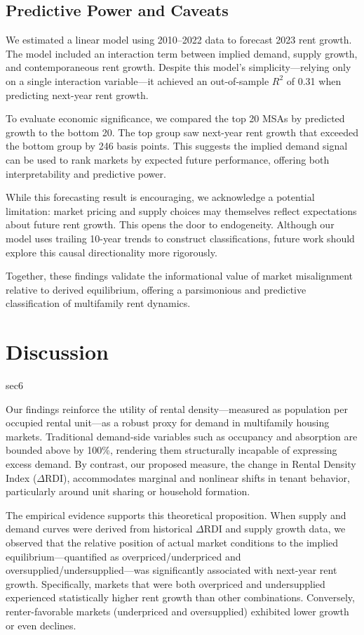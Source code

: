 \documentclass[APA,Times1COL]{WileyNJDv5} %
\begin{document}
\subsection{Predictive Power and Caveats}
We estimated a linear model using 2010--2022 data to forecast 2023 rent growth. The model included an interaction term between implied demand, supply growth, and contemporaneous rent growth. Despite this model’s simplicity—relying only on a single interaction variable—it achieved an out-of-sample $R^2$ of 0.31 when predicting next-year rent growth.

To evaluate economic significance, we compared the top 20 MSAs by predicted growth to the bottom 20. The top group saw next-year rent growth that exceeded the bottom group by 246 basis points. This suggests the implied demand signal can be used to rank markets by expected future performance, offering both interpretability and predictive power.

While this forecasting result is encouraging, we acknowledge a potential limitation: market pricing and supply choices may themselves reflect expectations about future rent growth. This opens the door to endogeneity. Although our model uses trailing 10-year trends to construct classifications, future work should explore this causal directionality more rigorously.

Together, these findings validate the informational value of market misalignment relative to derived equilibrium, offering a parsimonious and predictive classification of multifamily rent dynamics.


\section{Discussion}{sec6}

Our findings reinforce the utility of rental density---measured as population per occupied rental unit---as a robust proxy for demand in multifamily housing markets. Traditional demand-side variables such as occupancy and absorption are bounded above by 100\%, rendering them structurally incapable of expressing excess demand. By contrast, our proposed measure, the change in Rental Density Index (\(\Delta\text{RDI}\)), accommodates marginal and nonlinear shifts in tenant behavior, particularly around unit sharing or household formation.

The empirical evidence supports this theoretical proposition. When supply and demand curves were derived from historical \(\Delta\text{RDI}\) and supply growth data, we observed that the relative position of actual market conditions to the implied equilibrium---quantified as overpriced/underpriced and oversupplied/undersupplied---was significantly associated with next-year rent growth. Specifically, markets that were both overpriced and undersupplied experienced statistically higher rent growth than other combinations. Conversely, renter-favorable markets (underpriced and oversupplied) exhibited lower growth or even declines. 
\end{document}
